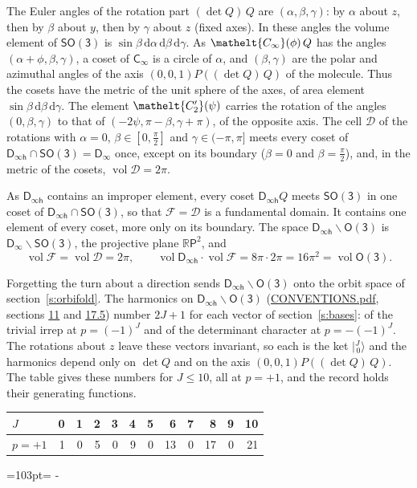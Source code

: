 \documentclass[10pt,a4paper]{article}
\newcommand{\needspace}[1]{\par\penalty-100\begingroup\dimen0=#1\relax\dimen2=\pagegoal
  \advance\dimen2-\pagetotal\ifdim\dimen0>\dimen2\relax\ifdim\dimen2>0pt\vfil\break\fi\fi
  \endgroup}
\numberwithin{equation}{section}
\newcommand{\eltfont}[1]{{\let\sigma\eltsigma\mathelt{#1}}}
\newcommand{\grp}[1]{\mathsf{#1}}
\newcommand{\elt}[1]{\eltfont{#1}}
\newcommand{\dirvec}[3]{(#1, #2, #3)}
\newcommand{\diff}{\mathrm{d}}
\newcommand{\jm}[2]{\bigl\lvert{}^{#1}_{\,#2}\bigr\rangle}
\newcommand{\vol}{\operatorname{vol}}
\newcommand{\fcell}{\mathcal{D}}
\newcommand{\fdomain}{\mathcal{F}}
\newcommand{\projplane}{\mathbb{R}\mathsf{P}^{2}}
\begin{document}
\leavevmode\label{n:angle.euler.alpha}\label{n:angle.euler.beta}\label{n:angle.euler.gamma}The Euler angles of the rotation part $(\det Q)\,Q$ are $(\alpha,\beta,\gamma)$: by $\alpha$ about $z$, then by $\beta$ about $y$, then by $\gamma$ about $z$ (fixed axes). In these angles the volume element of \href{SO3.pdf}{$\grp{SO(3)}$} is $\sin\beta\,\diff\alpha\,\diff\beta\,\diff\gamma$. As $\elt{C_{\infty}}(\phi)\,Q$ has the angles $(\alpha + \phi, \beta, \gamma)$, a coset of \href{Cinf.pdf}{$\grp{C_{\infty}}$} is a circle of $\alpha$, and $(\beta, \gamma)$ are the polar and azimuthal angles of the axis $\dirvec{0}{0}{1}P((\det Q)\,Q)$ of the molecule. Thus the cosets have the metric of the unit sphere of the axes, of area element $\sin\beta\,\diff\beta\,\diff\gamma$. The element $\elt{C_2'}(\psi)$ carries the rotation of the angles $(0, \beta, \gamma)$ to that of $(-2\psi, \pi - \beta, \gamma + \pi)$, of the opposite axis.
\leavevmode\label{n:set.cell}The cell $\fcell$ of the rotations with $\alpha = 0$, $\beta \in [0, \tfrac{\pi}{2}]$ and $\gamma \in (-\pi, \pi]$ meets every coset of $\grp{D_{\infty h}} \cap \grp{SO(3)} = \grp{D_{\infty}}$ once, except on its boundary ($\beta = 0$ and $\beta = \tfrac{\pi}{2}$), and, in the metric of the cosets, $\vol\fcell = 2\pi$.

\leavevmode\label{n:set.fundamental}As $\grp{D_{\infty h}}$ contains an improper element, every coset $\grp{D_{\infty h}}Q$ meets \href{SO3.pdf}{$\grp{SO(3)}$} in one coset of $\grp{D_{\infty h}} \cap \grp{SO(3)}$, so that $\fdomain = \fcell$ is a fundamental domain. It contains one element of every coset, more only on its boundary.
\leavevmode\label{n:set.projective}The space $\grp{D_{\infty h}}\backslash\grp{O(3)}$ is $\grp{D_{\infty}}\backslash\grp{SO(3)}$, the projective plane $\projplane$, and
\begin{equation}\label{e:volume}\vol\fdomain = \vol\fcell = 2\pi,\qquad \vol\grp{D_{\infty h}}\cdot\vol\fdomain = 8\pi\cdot 2\pi = 16\pi^2 = \vol\grp{O(3)}.\end{equation}

Forgetting the turn about a direction sends $\grp{D_{\infty h}}\backslash\grp{O(3)}$ onto the orbit space of section~\ref{s:orbifold}.
The harmonics on $\grp{D_{\infty h}}\backslash\grp{O(3)}$ (\href{../../CONVENTIONS.pdf}{CONVENTIONS.pdf}, sections \href{../../CONVENTIONS.pdf\#conv.11}{11} and \href{../../CONVENTIONS.pdf\#conv.17.5}{17.5}) number $2J + 1$ for each vector of section~\ref{s:bases}: of the trivial irrep at $p = (-1)^J$ and of the determinant character at $p = -(-1)^J$. The rotations about $z$ leave these vectors invariant, so each is the ket $\jm{J}{0}$ and the harmonics depend only on $\det Q$ and on the axis $\dirvec{0}{0}{1}P((\det Q)\,Q)$. The table gives these numbers for $J \le 10$, all at $p = +1$, and the record holds their generating functions.
{\small\setlength{\tabcolsep}{4pt}\begin{longtable}{@{}lrrrrrrrrrrr@{}}\toprule
$J$ & 0 & 1 & 2 & 3 & 4 & 5 & 6 & 7 & 8 & 9 & 10\\\midrule\endhead
\bottomrule\endfoot\endlastfoot
$p = +1$ & 1 & 0 & 5 & 0 & 9 & 0 & 13 & 0 & 17 & 0 & 21\\
\bottomrule\end{longtable}}
\needspace{103pt}
\end{document}
